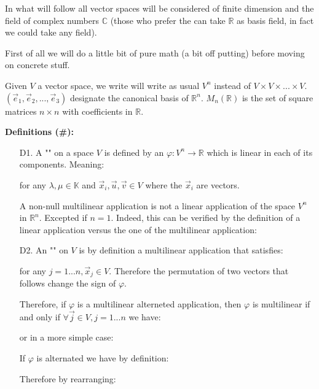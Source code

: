 	In what will follow all vector spaces will be considered of finite dimension and the field of complex numbers $\mathbb{C}$ (those who prefer the can take $\mathbb{R}$ as basis field, in fact we could take any field).
	
	First of all we will do a little bit of pure math (a bit off putting) before moving on  concrete stuff.
	
	Given $V$ a vector space, we write will write as usual $V^n$ instead of $V\times V\times... \times V$. $(\vec{e}_1,\vec{e}_2,...,\vec{e}_3)$ designate the canonical basis of $\mathbb{R}^n$. $M_n(\mathbb{R})$ is the set of square matrices $n\times n$ with coefficients in $\mathbb{R}$.
	
	\textbf{Definitions (\#\mydef):}
	\begin{enumerate}
		\item[D1.] A "" on a space $V$ is defined by an $\varphi: V^n \rightarrow \mathbb{R}$ which is linear in each of its components. Meaning:
		
		for any $\lambda,\mu\in \mathbb{K}$ and $\vec{x}_i,\vec{u},\vec{v}\in V$ where the $\vec{x}_i$ are vectors.
		\begin{tcolorbox}[title=Remark,colframe=black,arc=10pt]
		A non-null multilinear application is not a linear application of the space $V^n$ in $\mathbb{R}^n$. Excepted if $n=1$. Indeed, this can be verified by the definition of a linear application  versus the one of the multilinear application:
		
		\end{tcolorbox}
		\item[D2.] An "" on $V$ is by definition a multilinear application that satisfies:
		
		for any $j=1...n,\vec{x}_j\in V$. Therefore the permutation of two vectors that follows change the sign of $\varphi$.
		\begin{theorem}
		Therefore, if $\varphi$ is a multilinear alterneted application, then $\varphi$ is multilinear if and only if $\forall \vec{j}\in V,j=1...n$ we have:
		
		or in a more simple case:
		
		\end{theorem}
		\begin{dem}
		If $\varphi$ is alternated we have by definition:
		
		Therefore by rearranging:
		

\end{dem}
\end{enumerate}

